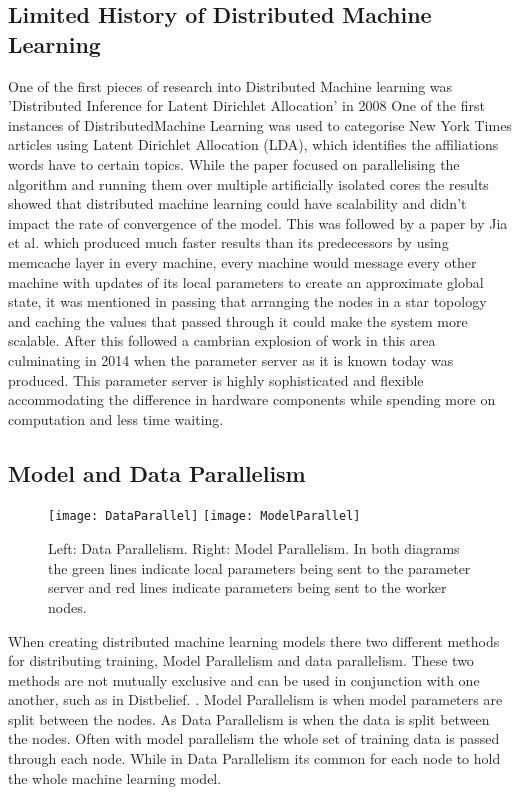 \subsection{Limited History of Distributed Machine Learning}
One of the first pieces of research into Distributed Machine learning was
’Distributed Inference for Latent Dirichlet Allocation’ in 2008
\cite{newman2008distributed} One of the first instances of DistributedMachine
Learning  was  used  to  categorise  New York  Times  articles  using  Latent
Dirichlet Allocation (LDA), which identifies the affiliations words have to
certain topics.  While the paper focused on parallelising the algorithm and
running them over multiple artificially isolated cores the results showed that
distributed machine learning could have scalability and didn’t impact the rate
of convergence of the model.  This was followed by a paper by Jia et al.
\cite{ParallelTopicModels} which produced much faster results than its
predecessors by using memcache layer in every machine, every machine would
message every other machine with updates of its local parameters to create an
approximate global state, it was mentioned in passing that arranging the nodes
in a star topology and caching the values that passed through it could make the
system more scalable. After this followed a cambrian explosion of work in this
area \cite{Ahmed2012YahooLDA, li2014communication, Dean2012Distbelief,
googlemapreduce2008} culminating in 2014 when the parameter server as it is
known today \cite{LI2014ParameterServers} was produced. This parameter server is
highly sophisticated and flexible accommodating the difference in hardware
components while spending more on computation and less time waiting.



\subsection{Model and Data Parallelism}
\begin{figure}[h]
    \centering
    \texttt{[image: DataParallel]}
    \texttt{[image: ModelParallel]}
    \caption{Left: Data Parallelism. Right: Model Parallelism. In both diagrams
        the green lines indicate local parameters being sent to the parameter
        server and red lines indicate parameters being sent to the worker nodes.}
\end{figure}
When creating distributed machine learning models there two different methods
for distributing training, Model Parallelism and data parallelism. These two
methods are not mutually exclusive and can be used in conjunction with one
another, such as in Distbelief. \cite{Dean2012Distbelief}. Model Parallelism is
when model parameters are split between the nodes. As Data Parallelism is when
the data is split between the nodes. \cite{Xing2015Petuum} Often with model
parallelism the whole set of training data is passed through each node. While in
Data Parallelism its common for each node to hold the whole machine learning
model.

